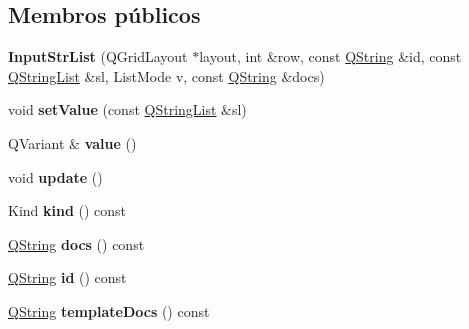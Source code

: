 \subsection*{Membros públicos}
\begin{DoxyCompactItemize}
\item 
\hypertarget{class_input_str_list_a4bd3d15c3f4355de6c693291c9adaba9}{{\bfseries Input\-Str\-List} (Q\-Grid\-Layout $\ast$layout, int \&row, const \hyperlink{class_q_string}{Q\-String} \&id, const \hyperlink{class_q_string_list}{Q\-String\-List} \&sl, List\-Mode v, const \hyperlink{class_q_string}{Q\-String} \&docs)}\label{class_input_str_list_a4bd3d15c3f4355de6c693291c9adaba9}

\item 
\hypertarget{class_input_str_list_a5aeec1b3233a5f7f7ff4c0ed69c294b9}{void {\bfseries set\-Value} (const \hyperlink{class_q_string_list}{Q\-String\-List} \&sl)}\label{class_input_str_list_a5aeec1b3233a5f7f7ff4c0ed69c294b9}

\item 
\hypertarget{class_input_str_list_a5dd524f67ae7ed0efa64313fe71e4605}{Q\-Variant \& {\bfseries value} ()}\label{class_input_str_list_a5dd524f67ae7ed0efa64313fe71e4605}

\item 
\hypertarget{class_input_str_list_ac5c54df7ed3b930268c8d7752c101725}{void {\bfseries update} ()}\label{class_input_str_list_ac5c54df7ed3b930268c8d7752c101725}

\item 
\hypertarget{class_input_str_list_aa9d037bed9f9a083d0cd01485637d843}{Kind {\bfseries kind} () const }\label{class_input_str_list_aa9d037bed9f9a083d0cd01485637d843}

\item 
\hypertarget{class_input_str_list_ab817379a6af112723841e17901826ec2}{\hyperlink{class_q_string}{Q\-String} {\bfseries docs} () const }\label{class_input_str_list_ab817379a6af112723841e17901826ec2}

\item 
\hypertarget{class_input_str_list_a06be2d738a4fe9fdb941cb24161b26c0}{\hyperlink{class_q_string}{Q\-String} {\bfseries id} () const }\label{class_input_str_list_a06be2d738a4fe9fdb941cb24161b26c0}

\item 
\hypertarget{class_input_str_list_a76f4a83c9cf30eb78d2b5f276cf649de}{\hyperlink{class_q_string}{Q\-String} {\bfseries template\-Docs} () const }\label{class_input_str_list_a76f4a83c9cf30eb78d2b5f276cf649de}


\end{DoxyCompactItemize}
